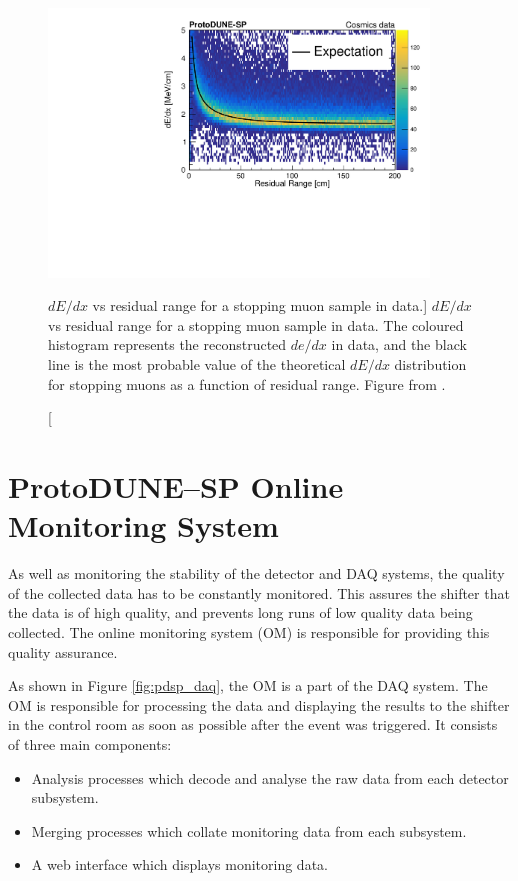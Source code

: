 \begin{figure}

	\centering

	\includegraphics[width=0.9\textwidth]{figures/dedx_v_rr.pdf}

	\caption
	[$dE/dx$ vs residual range for a stopping muon sample in \protodune{} data.]
	{$dE/dx$ vs residual range for a stopping muon sample in \protodune{} data.
	The coloured histogram represents the reconstructed $de/dx$ in \protodune{}
	data, and the black line is the most probable value of the theoretical 
	$dE/dx$ distribution for stopping muons as a function of residual range.  
	Figure from \cite{protoduneperf}.}

	\label{fig:dedx_v_rr}

\end{figure}

\section{ProtoDUNE--SP Online Monitoring System} \label{sec:pdsp_om}

As well as monitoring the stability of the detector and DAQ systems, the quality
of the collected data has to be constantly monitored. This assures the shifter 
that the data is of high quality, and prevents long runs of low quality data
being collected. The online monitoring system (OM) is responsible for 
providing this quality assurance.

As shown in Figure \ref{fig:pdsp_daq}, the OM is a part of the \protodune{} DAQ
system. The OM is responsible for processing the data and displaying
the results to the shifter in the control room as soon as possible after the
event was triggered. It consists of three main components:
\begin{itemize}
	\item Analysis processes which decode and analyse the raw data from each 
		detector subsystem.
	\item Merging processes which collate monitoring data from each subsystem.
	\item A web interface which displays monitoring data.
\end{itemize}

